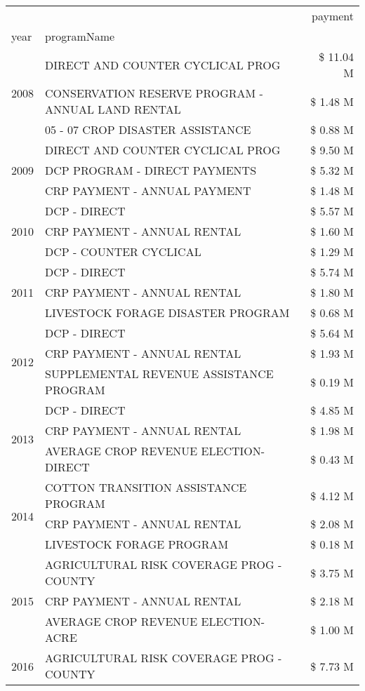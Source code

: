 \begin{tabular}{llr}
\toprule
 &  & payment \\
year & programName &  \\
\midrule
\multirow[t]{3}{*}{2008} & DIRECT AND COUNTER CYCLICAL PROG & \$ 11.04 M \\
 & CONSERVATION RESERVE PROGRAM - ANNUAL LAND RENTAL & \$ 1.48 M \\
 & 05 - 07 CROP DISASTER ASSISTANCE & \$ 0.88 M \\
\cline{1-3}
\multirow[t]{3}{*}{2009} & DIRECT AND COUNTER CYCLICAL PROG & \$ 9.50 M \\
 & DCP PROGRAM - DIRECT PAYMENTS & \$ 5.32 M \\
 & CRP PAYMENT - ANNUAL PAYMENT & \$ 1.48 M \\
\cline{1-3}
\multirow[t]{3}{*}{2010} & DCP - DIRECT & \$ 5.57 M \\
 & CRP PAYMENT - ANNUAL RENTAL & \$ 1.60 M \\
 & DCP - COUNTER CYCLICAL & \$ 1.29 M \\
\cline{1-3}
\multirow[t]{3}{*}{2011} & DCP - DIRECT & \$ 5.74 M \\
 & CRP PAYMENT - ANNUAL RENTAL & \$ 1.80 M \\
 & LIVESTOCK FORAGE DISASTER PROGRAM & \$ 0.68 M \\
\cline{1-3}
\multirow[t]{3}{*}{2012} & DCP - DIRECT & \$ 5.64 M \\
 & CRP PAYMENT - ANNUAL RENTAL & \$ 1.93 M \\
 & SUPPLEMENTAL REVENUE ASSISTANCE PROGRAM & \$ 0.19 M \\
\cline{1-3}
\multirow[t]{3}{*}{2013} & DCP - DIRECT & \$ 4.85 M \\
 & CRP PAYMENT - ANNUAL RENTAL & \$ 1.98 M \\
 & AVERAGE CROP REVENUE ELECTION-DIRECT & \$ 0.43 M \\
\cline{1-3}
\multirow[t]{3}{*}{2014} & COTTON TRANSITION ASSISTANCE PROGRAM & \$ 4.12 M \\
 & CRP PAYMENT - ANNUAL RENTAL & \$ 2.08 M \\
 & LIVESTOCK FORAGE PROGRAM & \$ 0.18 M \\
\cline{1-3}
\multirow[t]{3}{*}{2015} & AGRICULTURAL RISK COVERAGE PROG - COUNTY & \$ 3.75 M \\
 & CRP PAYMENT - ANNUAL RENTAL & \$ 2.18 M \\
 & AVERAGE CROP REVENUE ELECTION-ACRE & \$ 1.00 M \\
\cline{1-3}
\multirow[t]{3}{*}{2016} & AGRICULTURAL RISK COVERAGE PROG - COUNTY & \$ 7.73 M \\

\end{tabular}
